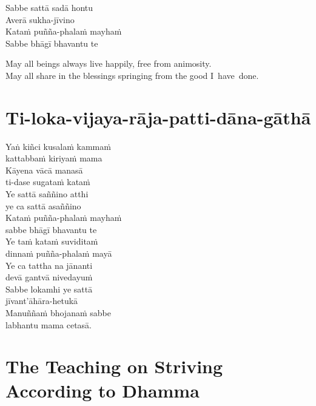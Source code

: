 
\begin{paritta}
Sabbe sattā sadā hontu\\
Averā sukha-jīvino\\
Kataṁ puñña-phalaṁ mayhaṁ\\
Sabbe bhāgī bhavantu te
\end{paritta}

\begin{english}
  May all beings always live happily, free from animosity.\\
  May all share in the blessings springing from the good I~have~done.
\end{english}

\section{Ti-loka-vijaya-rāja-patti-dāna-gāthā}


Yaṅ kiñci kusalaṁ kammaṁ\\
\vin kattabbaṁ kiriyaṁ mama\\
Kāyena vācā manasā\\
\vin ti-dase sugataṁ kataṁ\\
Ye sattā saññino atthi\\
\vin ye ca sattā asaññino\\
Kataṁ puñña-phalaṁ mayhaṁ\\
\vin sabbe bhāgī bhavantu te\\
Ye taṁ kataṁ suviditaṁ\\
\vin dinnaṁ puñña-phalaṁ mayā\\
Ye ca tattha na jānanti\\
\vin devā gantvā nivedayuṁ\\
Sabbe lokamhi ye sattā\\
\vin jīvant'āhāra-hetukā\\
Manuññaṁ bhojanaṁ sabbe\\
\vin labhantu mama cetasā.


\section[Striving According to Dhamma]{The Teaching on Striving According to Dhamma}


